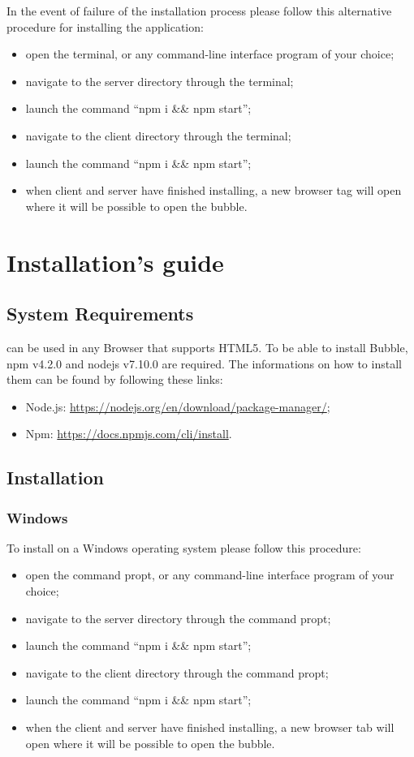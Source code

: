 In the event of failure of the installation process please follow this alternative procedure for installing the application:
\begin{itemize}
	\item open the terminal, or any command-line interface program of your choice;
	\item navigate to the server directory through the terminal;
	\item launch the command ``npm i \&\& npm start'';
	\item navigate to the client directory through the terminal;
	\item launch the command ``npm i \&\& npm start'';
	\item when client and server have finished installing, a new browser tag will open where it will be possible to open the bubble.
\end{itemize}

\section{\DemoName{} Installation's guide}

\subsection{ \DemoName{} System Requirements}
\DemoName{} can be used in any Browser that supports HTML5. 
To be able to install \DemoName{} Bubble, npm v4.2.0 and nodejs v7.10.0 are required. The informations on how to install them can be found by following these links:
\begin{itemize}
	\item Node.js: \url{https://nodejs.org/en/download/package-manager/};
	\item Npm: \url{https://docs.npmjs.com/cli/install}.
\end{itemize}

\subsection{Installation}
\subsubsection{Windows}

To install \DemoName{} on a Windows operating system please follow this procedure:
\begin{itemize}
	\item open the command propt, or any command-line interface program of your choice;
	\item navigate to the server directory through the command propt;
	\item launch the command ``npm i \&\& npm start'';
	\item navigate to the client directory through the command propt;
	\item launch the command ``npm i \&\& npm start'';
	\item when the client and server have finished installing, a new browser tab will open where it will be possible to open the bubble.
\end{itemize}

